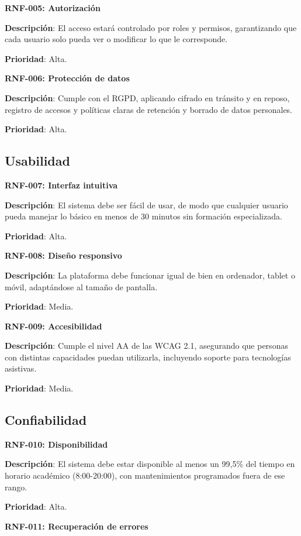 \documentclass[12pt,a4paper,oneside]{report}
\begin{document}
\textbf{RNF-005: Autorización}

\textbf{Descripción}: El acceso estará controlado por roles y permisos, garantizando que cada usuario solo pueda ver o modificar lo que le corresponde.

\textbf{Prioridad}: Alta.

\textbf{RNF-006: Protección de datos}

\textbf{Descripción}: Cumple con el RGPD, aplicando cifrado en tránsito y en reposo, registro de accesos y políticas claras de retención y borrado de datos personales.

\textbf{Prioridad}: Alta.

\subsection{Usabilidad}\label{usabilidad}

\textbf{RNF-007: Interfaz intuitiva}

\textbf{Descripción}: El sistema debe ser fácil de usar, de modo que cualquier usuario pueda manejar lo básico en menos de 30 minutos sin formación especializada.

\textbf{Prioridad}: Alta.

\textbf{RNF-008: Diseño responsivo}

\textbf{Descripción}: La plataforma debe funcionar igual de bien en ordenador, tablet o móvil, adaptándose al tamaño de pantalla.

\textbf{Prioridad}: Media.

\textbf{RNF-009: Accesibilidad}

\textbf{Descripción}: Cumple el nivel AA de las WCAG 2.1, asegurando que personas con distintas capacidades puedan utilizarla, incluyendo soporte para tecnologías asistivas.

\textbf{Prioridad}: Media.

\subsection{Confiabilidad}\label{confiabilidad}

\textbf{RNF-010: Disponibilidad}

\textbf{Descripción}: El sistema debe estar disponible al menos un 99,5\% del tiempo en horario académico (8:00-20:00), con mantenimientos programados fuera de ese rango.

\textbf{Prioridad}: Alta.

\textbf{RNF-011: Recuperación de errores}
\end{document}
